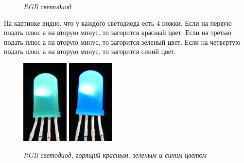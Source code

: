 \documentclass[a4paper, 12pt]{article}
\newcommand{\image}[3]{
	\begin{figure}[ht]
		\center{\texttt{[image: img/\#1]} }
		\caption{\textit{#3}}\end{figure}
}
\begin{document}
\image{Светодиод.png}{140}{RGB светодиод}

На картинке видно, что у каждого светодиода есть 4 ножки. Если на первую подать
плюс а на вторую минус, то загорится красный цвет. Если на третью подать
плюс а на вторую минус, то загорится зеленый цвет. Если на четвертую подать
плюс а на вторую минус, то загорится синий цвет.

\begin{figure}[ht]
  \includegraphics[height=160px]{img/Светодиод зеленый.jpg}
  \includegraphics[height=160px]{img/Светодиод синий.jpg}
  \caption{\textit{RGB светодиод, горящий красным, зеленым и синим цветом}}
\end{figure}
\end{document}
